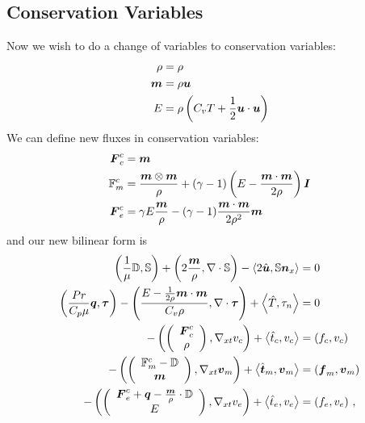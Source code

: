 \documentclass{article}
\begin{document}
\subsection*{Conservation Variables}
Now we wish to do a change of variables to conservation variables: 
\begin{align*}
\rho&=\rho\\
\bfm&=\rho\bfu\\
E&=\rho\LRp{C_v T+\frac{1}{2}\bfu\cdot\bfu}
\end{align*}
We can define new fluxes in conservation variables:
\begin{align*}
\bfF^c_c&=\bfm\\
\mathbb{F}^c_m&=\frac{\bfm\otimes\bfm}{\rho}+(\gamma-1)\LRp{E-\frac{\bfm\cdot\bfm}{2\rho}}\bfI\\
\bfF^c_e&=\gamma E\frac{\bfm}{\rho}-(\gamma-1)\frac{\bfm\cdot\bfm}{2\rho^2}\bfm\\
\end{align*}
and our new bilinear form is
\begin{subequations}
\label{eq:conservationBF}
\begin{align}
	\LRp{\frac{1}{\mu}\mathbb{D},\mathbb{S}}+\LRp{2\frac{\bfm}{\rho},\Div\mathbb{S}}
	-\LRa{2\hat\bfu,\mathbb{S}\bfn_x}&=0\\
	\LRp{\frac{Pr}{C_p\mu}\bfq,\bftau}-\LRp{\frac{E-\frac{1}{2\rho}\bfm\cdot\bfm}{C_v\rho},\Div\bftau}+\LRa{\hat T,\tau_n}&=0\\
	-\LRp{\vecttwo{\bfF^c_c}{\rho},\Gradxt v_c}+\LRa{\hat t_c,v_c}&=\LRp{f_c,v_c}\\
	-\LRp{\vecttwo{\mathbb{F}^c_m-\mathbb{D}}{\bfm},\Gradxt\bfv_m}+\LRa{\hat\bft_m,\bfv_m}&=\LRp{\bff_m,\bfv_m}\\
	-\LRp{\vecttwo{\bfF^c_e+\bfq-\frac{\bfm}{\rho}\cdot\mathbb{D}}{E},\Gradxt v_e}
	+\LRa{\hat t_e,v_e}&=\LRp{f_e,v_e}\,,
\end{align}
\end{subequations}
\end{document}
